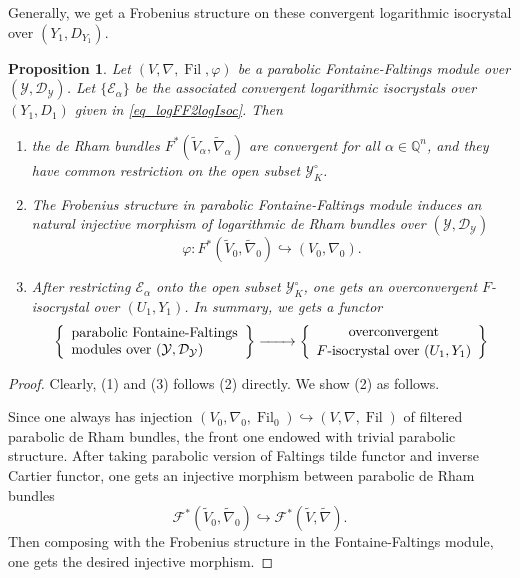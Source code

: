 \documentclass[12pt,twoside]{book}
\theoremstyle{plain}
\newtheorem{proposition}[proposition]{Proposition}
\theoremstyle{definition}
\theoremstyle{remark}
\newcommand{\bQ}{{\mathbb Q}}
\newcommand{\mD}{{\mathcal D}}
\newcommand{\mE}{{\mathcal E}}
\newcommand{\mF}{{\mathcal F}}
\newcommand{\mY}{{\mathcal Y}}
\DeclareMathOperator\Fil{Fil}
\numberwithin{equation}{section}
\begin{document}
Generally, we get a Frobenius structure on these convergent logarithmic isocrystal over $(Y_1,D_{Y_1})$.
\begin{proposition} \label{thm_paraFF2overconvFIsoc}
Let $(V,\nabla,\Fil,\varphi)$ be a parabolic Fontaine-Faltings module over $(\mY,\mD_\mY)$. Let $\{\mE_\alpha\}$ be the associated convergent logarithmic isocrystals over $(Y_1,D_1)$ given in \eqref{eq_logFF2logIsoc}. Then
\begin{enumerate}
\item[$(1)$] the de Rham bundles $F^*(\widetilde{V}_\alpha,\widetilde{\nabla}_\alpha)$ are convergent for all $\alpha\in\bQ^n$, and they have common restriction on the open subset $\mathcal Y_K^\circ$.
\item[$(2)$] The Frobenius structure in parabolic Fontaine-Faltings module induces an natural injective morphism of logarithmic de Rham bundles over $(\mY,\mD_\mY)$
\[\varphi\colon F^*(\widetilde{V}_0,\widetilde{\nabla}_0)\hookrightarrow (V_0,\nabla_0).\]
\item[$(3)$] After restricting $\mathcal E_\alpha$ onto the open subset $\mathcal Y_K^\circ$, one gets an overconvergent $F$-isocrystal over $(U_1,Y_1)$. In summary, we gets a functor
\begin{equation}\label{eq:logFF2logFIsoc}
\left\{
\begin{array}{lll}
\text{parabolic Fontaine-Faltings}\\
\text{modules over $(\mY,\mD_{\mY})$}\\
\end{array}
\right\}
\xrightarrow{\quad\quad}
\left\{{\text{
overconvergent
} \atop \text{
$F$-isocrystal over $(U_1,Y_1)$
}}\right\}
\end{equation}
\end{enumerate}

\end{proposition}
\begin{proof}
Clearly, (1) and (3) follows (2) directly. We show (2) as follows.

Since one always has injection $(V_0,\nabla_0,\Fil_0)\hookrightarrow (V,\nabla,\Fil)$ of filtered parabolic de Rham bundles, the front one endowed with trivial parabolic structure. After taking parabolic version of Faltings tilde functor and inverse Cartier functor, one gets an injective morphism between parabolic de Rham bundles
\[\mF^*(\widetilde{V}_0,\widetilde{\nabla}_0) \hookrightarrow \mF^*(\widetilde V,\widetilde\nabla).\]
Then composing with the Frobenius structure in the Fontaine-Faltings module, one gets the desired injective morphism.
\end{proof}
\end{document}
